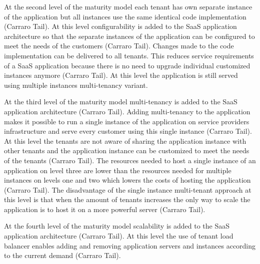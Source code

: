 \documentclass[conference]{sasmoota2017}
\begin{document}
At the second level of the maturity model each tenant has own separate instance of the application but all instances use the same identical code implementation (Carraro Tail). At this level configurability is added to the SaaS application architecture so that the separate instances of the application can be configured to meet the needs of the customers (Carraro Tail). Changes made to the code implementation can be delivered to all tenants. This reduces service requirements of a SaaS application because there is no need to upgrade individual customized instances anymore (Carraro Tail). At this level the application is still served using multiple instances multi-tenancy variant.

At the third level of the maturity model multi-tenancy is added to the SaaS application architecture (Carraro Tail). Adding multi-tenancy to the application makes it possible to run a single instance of the application on service providers infrastructure and serve every customer using this single instance (Carraro Tail). At this level the tenants are not aware of sharing the application instance with other tenants and the application instance can be customized to meet the needs of the tenants (Carraro Tail). The resources needed to host a single instance of an application on level three are lower than the resources needed for multiple instances on levels one and two which lowers the costs of hosting the application (Carraro Tail). The disadvantage of the single instance multi-tenant approach at this level is that when the amount of tenants increases the only way to scale the application is to host it on a more powerful server (Carraro Tail). 

At the fourth level of the maturity model scalability is added to the SaaS application architecture (Carraro Tail). At this level the use of tenant load balancer enables adding and removing application servers and instances according to the current demand (Carraro Tail).
\end{document}
